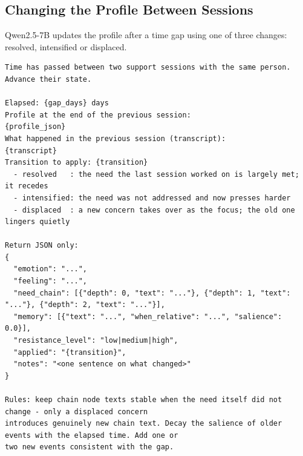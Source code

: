 \documentclass[journal]{IEEEtran}
\begin{document}
\subsection{Changing the Profile Between Sessions}
Qwen2.5-7B updates the profile after a time gap using one of three changes: resolved, intensified or displaced.
\begin{lstlisting}
Time has passed between two support sessions with the same person. Advance their state.

Elapsed: {gap_days} days
Profile at the end of the previous session:
{profile_json}
What happened in the previous session (transcript):
{transcript}
Transition to apply: {transition}
  - resolved   : the need the last session worked on is largely met; it recedes
  - intensified: the need was not addressed and now presses harder
  - displaced  : a new concern takes over as the focus; the old one lingers quietly

Return JSON only:
{
  "emotion": "...",
  "feeling": "...",
  "need_chain": [{"depth": 0, "text": "..."}, {"depth": 1, "text": "..."}, {"depth": 2, "text": "..."}],
  "memory": [{"text": "...", "when_relative": "...", "salience": 0.0}],
  "resistance_level": "low|medium|high",
  "applied": "{transition}",
  "notes": "<one sentence on what changed>"
}

Rules: keep chain node texts stable when the need itself did not change - only a displaced concern
introduces genuinely new chain text. Decay the salience of older events with the elapsed time. Add one or
two new events consistent with the gap.
\end{lstlisting}
\end{document}
